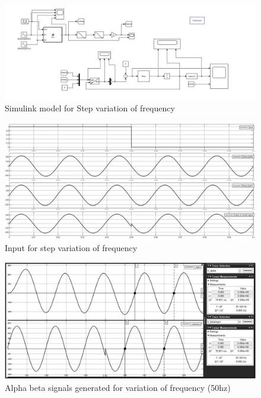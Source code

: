 \documentclass[a4paper,12pt]{iitmdiss}
\begin{document}
\begin{figure}[hbt!]
    \centering
    \includegraphics[width=1.0\textwidth]{Model simulation.jpg}
    \caption{Simulink model for Step variation of frequency}
\end{figure}

\begin{figure}[hbt!]
    \centering
    \includegraphics[width=1.0\textwidth]{Step variation of frequency.jpg}
    \caption{Input for step variation of frequency}
\end{figure}

\begin{figure}[hbt!]
    \centering
    \includegraphics[width=1.0\textwidth]{alhpa_beta (50hz).jpg}
    \caption{Alpha beta signals generated for variation of frequency (50hz)}
\end{figure}
\end{document}
